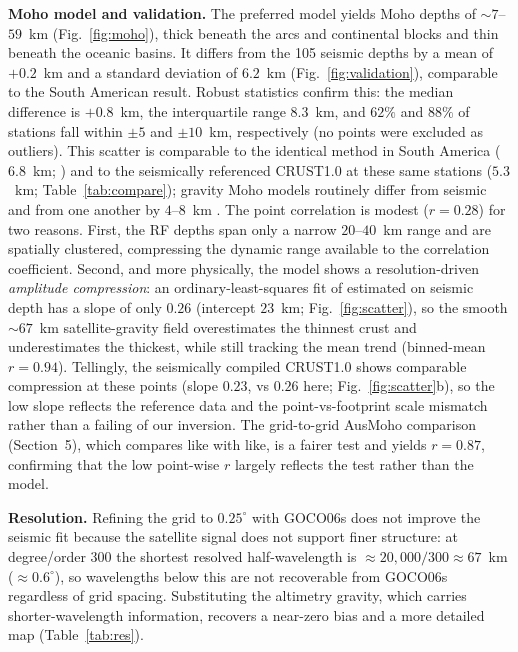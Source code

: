 \documentclass[extra,mreferee]{gji}
\begin{document}
\textbf{Moho model and validation.} The preferred model yields Moho depths of
$\sim7$--$59$~km (Fig.~\ref{fig:moho}), thick beneath the arcs and continental
blocks and thin beneath the oceanic basins. It differs from the 105 seismic depths
by a mean of $+0.2$~km and a standard deviation of $6.2$~km
(Fig.~\ref{fig:validation}), comparable to the South American result. Robust
statistics confirm this: the median difference is $+0.8$~km, the interquartile
range $8.3$~km, and $62\%$ and $88\%$ of stations fall within $\pm5$ and
$\pm10$~km, respectively (no points were excluded as outliers). This scatter is
comparable to the identical method in South America ($6.8$~km; \citealt{uieda2017})
and to the seismically referenced {CRUST1.0} at these same stations ($5.3$~km;
Table~\ref{tab:compare}); gravity Moho models routinely differ from seismic and from one
another by $4$--$8$~km \citep{vandermeijde2013,reguzzoni2015}. The point
correlation is modest ($r=0.28$) for two reasons. First, the RF depths span only a
narrow $20$--$40$~km range and are spatially clustered, compressing the dynamic
range available to the correlation coefficient. Second, and more physically, the
model shows a resolution-driven \emph{amplitude compression}: an
ordinary-least-squares fit of estimated on seismic depth has a slope of only
$0.26$ (intercept $23$~km; Fig.~\ref{fig:scatter}), so the smooth $\sim67$~km
satellite-gravity field overestimates the thinnest crust and underestimates the
thickest, while still tracking the mean trend (binned-mean $r=0.94$). Tellingly,
the seismically compiled {CRUST1.0} shows comparable compression at these
points (slope $0.23$, vs $0.26$ here; Fig.~\ref{fig:scatter}b), so the low slope reflects the
reference data and the point-vs-footprint scale mismatch rather than a failing of
our inversion. The
grid-to-grid {AusMoho} comparison (Section~5), which compares like with like, is a
fairer test and yields $r=0.87$, confirming that the low point-wise $r$ largely
reflects the test rather than the model.

\textbf{Resolution.} Refining the grid to $0.25^{\circ}$ with {GOCO06s} does not
improve the seismic fit because the satellite signal does not support finer
structure: at degree/order 300 the shortest resolved half-wavelength is
$\approx20{,}000/300\approx67$~km ($\approx0.6^{\circ}$), so wavelengths below this
are not recoverable from {GOCO06s} regardless of grid spacing. Substituting the
altimetry gravity, which carries shorter-wavelength information, recovers a
near-zero bias and a more detailed map (Table~\ref{tab:res}).
\end{document}
